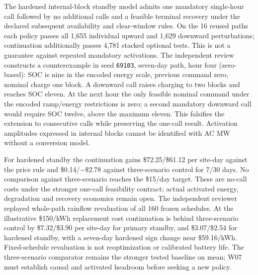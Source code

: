 \documentclass[11pt,letterpaper]{article}
\begin{document}
The hardened internal-block standby model admits one mandatory single-hour call followed by no additional calls and a feasible terminal recovery under the declared subsequent availability and clear-window rules. On the 16 reused paths each policy passes all 1,655 individual upward and 1,629 downward perturbations; continuation additionally passes 4,781 stacked optional tests. This is not a guarantee against repeated mandatory activations. The independent review constructs a counterexample in seed \texttt{69103}, seven-day path, hour four (zero-based): SOC is nine in the encoded energy scale, previous command zero, nominal charge one block. A downward call raises charging to two blocks and reaches SOC eleven. At the next hour the only feasible nominal command under the encoded ramp/energy restrictions is zero; a second mandatory downward call would require SOC twelve, above the maximum eleven. This falsifies the extension to consecutive calls while preserving the one-call result. Activation amplitudes expressed in internal blocks cannot be identified with AC MW without a conversion model.

For hardened standby the continuation gains \$72.25/\$61.12 per site-day against the price rule and \$0.14/\(-\$2.78\) against three-scenario control for 7/30 days. No comparison against three-scenario reaches the \$15/day target. These are no-call costs under the stronger one-call feasibility contract; actual activated energy, degradation and recovery economics remain open. The independent reviewer replayed whole-path rainflow revaluation of all 160 frozen schedules. At the illustrative \$150/kWh replacement cost continuation is behind three-scenario control by \$7.32/\$3.90 per site-day for primary standby, and \$3.07/\$2.54 for hardened standby, with a seven-day hardened sign change near \$59.16/kWh. Fixed-schedule revaluation is not reoptimization or calibrated battery life. The three-scenario comparator remains the stronger tested baseline on mean; W07 must establish causal and activated headroom before seeking a new policy.
\end{document}
